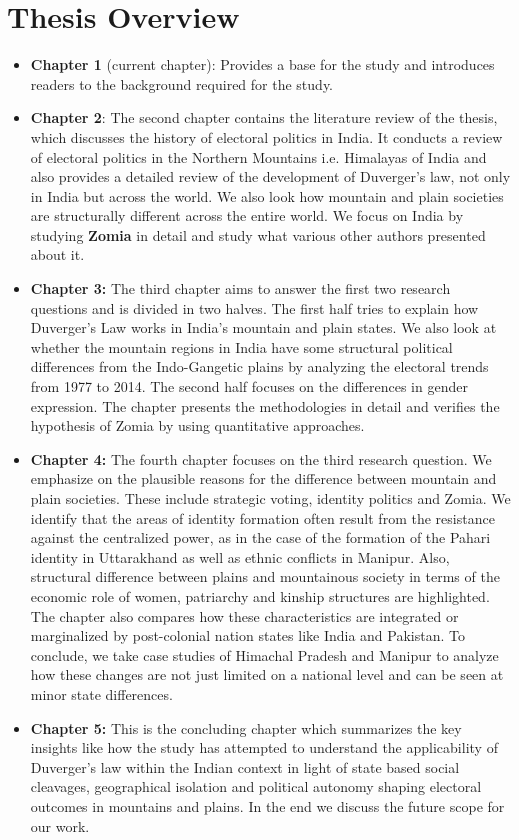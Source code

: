 \begin{sloppypar}
\section{Thesis Overview}

\begin{itemize}
    \item \textbf{Chapter 1} (current chapter): Provides a base for the study and introduces readers to the background required for the study.
    \item \textbf{Chapter 2}: The second chapter contains the literature review of the thesis, which discusses the history of electoral politics in India. It conducts a review of electoral politics in the Northern Mountains i.e. Himalayas of India and also provides a detailed review of the development of Duverger's law, not only in India but across the world.  We also look how mountain and plain societies are structurally different across the entire world. We focus on India by studying \textbf{Zomia} in detail and study what various other authors presented about it.
    \item \textbf{Chapter 3:} The third chapter aims to answer the first two research questions and is divided in two halves. The first half tries to explain how Duverger's Law works in India's mountain and plain states. We also look at whether the mountain regions in India have some structural political differences from the Indo-Gangetic plains by analyzing the electoral trends from 1977 to 2014. The second half focuses on the differences in gender expression. The chapter presents the methodologies in detail and verifies the hypothesis of Zomia by using quantitative approaches.
    \item \textbf{Chapter 4:} The fourth chapter focuses on the third research question. We emphasize on the plausible reasons for the difference between mountain and plain societies. These include  strategic voting, identity politics and Zomia. We identify that the areas of identity formation often result from the resistance against the centralized power, as in the case of the formation of the Pahari identity in Uttarakhand as well as ethnic conflicts in Manipur. Also, structural difference between plains and mountainous society in terms of the economic role of women, patriarchy and kinship structures are highlighted. The chapter also compares how these characteristics are integrated or marginalized by post-colonial nation states like India and Pakistan. To conclude, we take case studies of Himachal Pradesh and Manipur to analyze how these changes are not just limited on a national level and can be seen at minor state differences.
    \item \textbf{Chapter 5:} This is the concluding chapter which summarizes the key insights like how the study  has attempted to understand the applicability of Duverger's law within the Indian context in light of state based social cleavages, geographical isolation and political autonomy shaping electoral outcomes in mountains and plains. In the end we discuss the future scope for our work.
\end{itemize}

\end{sloppypar}